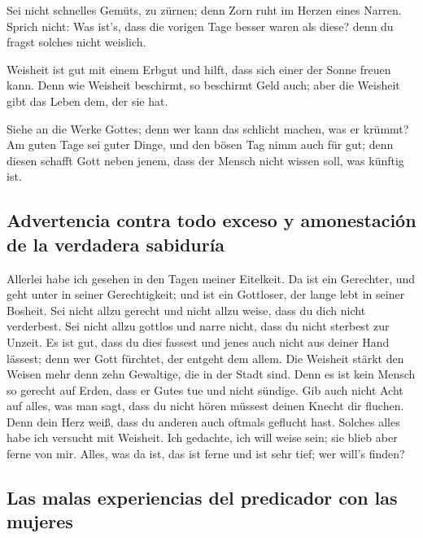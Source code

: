  Sei nicht schnelles Gemüts, zu zürnen; denn Zorn ruht im
Herzen eines Narren.  Sprich nicht: Was ist's, dass die
vorigen Tage besser waren als diese? denn du fragst solches nicht
weislich.

 Weisheit ist gut mit einem Erbgut und hilft, dass sich
einer der Sonne freuen kann.  Denn wie Weisheit
beschirmt, so beschirmt Geld auch; aber die Weisheit gibt das Leben dem,
der sie hat.

 Siehe an die Werke Gottes; denn wer kann das schlicht
machen, was er krümmt?  Am guten Tage sei guter Dinge,
und den bösen Tag nimm auch für gut; denn diesen schafft Gott neben
jenem, dass der Mensch nicht wissen soll, was künftig ist.

\hypertarget{advertencia-contra-todo-exceso-y-amonestaciuxf3n-de-la-verdadera-sabiduruxeda}{%
\subsection{Advertencia contra todo exceso y amonestación de la
verdadera
sabiduría}\label{advertencia-contra-todo-exceso-y-amonestaciuxf3n-de-la-verdadera-sabiduruxeda}}

 Allerlei habe ich gesehen in den Tagen meiner Eitelkeit.
Da ist ein Gerechter, und geht unter in seiner Gerechtigkeit; und ist
ein Gottloser, der lange lebt in seiner Bosheit.  Sei
nicht allzu gerecht und nicht allzu weise, dass du dich nicht
verderbest.  Sei nicht allzu gottlos und narre nicht,
dass du nicht sterbest zur Unzeit.  Es ist gut, dass du
dies fassest und jenes auch nicht aus deiner Hand lässest; denn wer Gott
fürchtet, der entgeht dem allem.  Die Weisheit stärkt den
Weisen mehr denn zehn Gewaltige, die in der Stadt sind. 
Denn es ist kein Mensch so gerecht auf Erden, dass er Gutes tue und
nicht sündige.  Gib auch nicht Acht auf alles, was man
sagt, dass du nicht hören müssest deinen Knecht dir fluchen.
 Denn dein Herz weiß, dass du anderen auch oftmals
geflucht hast.  Solches alles habe ich versucht mit
Weisheit. Ich gedachte, ich will weise sein; sie blieb aber ferne von
mir.  Alles, was da ist, das ist ferne und ist sehr tief;
wer will's finden?

\hypertarget{las-malas-experiencias-del-predicador-con-las-mujeres}{%
\subsection{Las malas experiencias del predicador con las
mujeres}\label{las-malas-experiencias-del-predicador-con-las-mujeres}}

